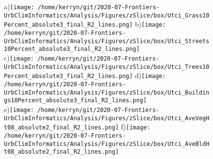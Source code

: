 \documentclass{article}
\begin{document}
\begin{figure}           %
\centering    
{\tiny a)}\texttt{[image: /home/kerryn/git/2020-07-Frontiers-UrbClimInformatics/Analysis/Figures/zSlice/box/Utci\_Grass10Percent\_absolute3\_final\_R2\_lines.png]}
{\tiny b)}\texttt{[image: /home/kerryn/git/2020-07-Frontiers-UrbClimInformatics/Analysis/Figures/zSlice/box/Utci\_Streets10Percent\_absolute3\_final\_R2\_lines.png]}\\
{\tiny c)}\texttt{[image: /home/kerryn/git/2020-07-Frontiers-UrbClimInformatics/Analysis/Figures/zSlice/box/Utci\_Trees10Percent\_absolute3\_final\_R2\_lines.png]}
{\tiny d)}\texttt{[image: /home/kerryn/git/2020-07-Frontiers-UrbClimInformatics/Analysis/Figures/zSlice/box/Utci\_Buildings10Percent\_absolute3\_final\_R2\_lines.png]}\\
{\tiny e)}\texttt{[image: /home/kerryn/git/2020-07-Frontiers-UrbClimInformatics/Analysis/Figures/zSlice/box/Utci\_AveVegHt08\_absolute2\_final\_R2\_lines.png]}
{\tiny f)}\texttt{[image: /home/kerryn/git/2020-07-Frontiers-UrbClimInformatics/Analysis/Figures/zSlice/box/Utci\_AveBldHt08\_absolute2\_final\_R2\_lines.png]}
\end{figure} 
\clearpage

















\begin{figure}           %
\centering    
{}
\end{figure} 
\clearpage
\end{document}
